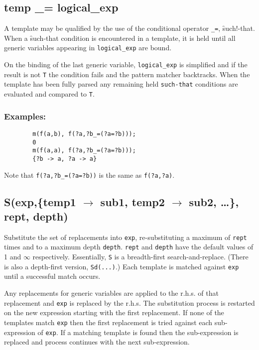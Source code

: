 \subsection{temp \_= logical\_exp}
\hypertarget{reserved:suchthatop}{}

\begin{sloppypar}
A template may be qualified by the use of the conditional operator \texttt{\_=},
\f{such!-that}.  When a \f{such-that} condition is encountered in a template, it
is held until all generic variables appearing in \texttt{logical\_exp} are bound.
\end{sloppypar}

On the binding of the last generic variable, \texttt{logical\_exp} is simplified
and if the result is not \texttt{T} the condition fails and the pattern matcher
backtracks.  When the template has been fully parsed any remaining
held \texttt{such-that} conditions are evaluated and compared to \texttt{T}.

\subsubsection*{Examples:}

\begin{verbatim}
        m(f(a,b), f(?a,?b_=(?a=?b)));
        0
        m(f(a,a), f(?a,?b_=(?a=?b)));
        {?b -> a, ?a -> a}
\end{verbatim}
Note that \texttt{f(?a,?b\_=(?a=?b))} is the same as \texttt{f(?a,?a)}.


\subsection[S(exp,\{temp1 -> sub1, temp2 -> sub2, \ldots\}, rept, depth)]{S(exp,\{temp1 $\to$ sub1, temp2 $\to$ sub2, \ldots\}, rept, depth)}

Substitute the set of replacements into \texttt{exp}, re-substituting a maximum
of \texttt{rept} times and to a maximum depth \texttt{depth}. \texttt{rept} and
\texttt{depth} have the default values of 1 and $\infty$ respectively.
Essentially, \texttt{S} is a breadth-first search-and-replace.  (There is also a
depth-first version, \texttt{Sd(...)}.)  Each template is matched against
\texttt{exp} until a successful match occurs.

Any replacements for generic variables are applied to the r.h.s. of that
replacement and \texttt{exp} is replaced by the r.h.s.  The substitution process
is restarted on the new expression starting with the first replacement.  If none
of the templates match \texttt{exp} then the first replacement is tried against
each sub-expression of \texttt{exp}. If a matching template is found then the
sub-expression is replaced and process continues with the next sub-expression.

